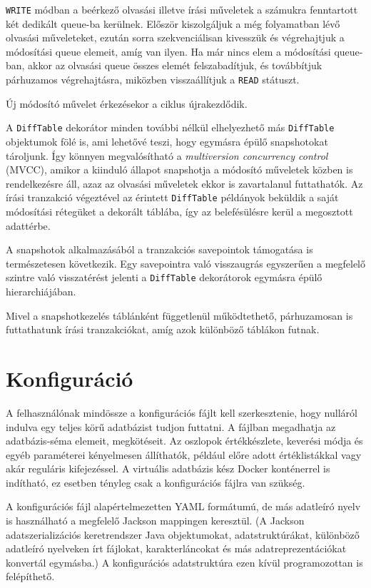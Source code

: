 \documentclass[
    parspace,
    noindent,
    nohyp,
]{elteiktdk}[2023/04/10]
\newcommand{\todoref}[1]{\todo[inline, noinlinepar, color=red, textcolor=white, inlinewidth=0.6cm, caption={#1}]{\large \textbf{×}}}
\begin{document}
\texttt{WRITE} módban a beérkező olvasási illetve írási műveletek
a számukra fenntartott két dedikált queue-ba kerülnek.
Először kiszolgáljuk a még folyamatban lévő olvasási műveleteket,
ezután sorra szekvenciálisan kivesszük és végrehajtjuk a módosítási queue elemeit, amíg van ilyen.
Ha már nincs elem a módosítási queue-ban,
akkor az olvasási queue összes elemét felszabadítjuk, és továbbítjuk párhuzamos végrehajtásra,
miközben visszaállítjuk a \texttt{READ} státuszt.

Új módosító művelet érkezésekor a ciklus újrakezdődik.

A \texttt{DiffTable} dekorátor minden további nélkül elhelyezhető
más \texttt{DiffTable} objektumok fölé is, ami lehetővé teszi, hogy egymásra épülő snapshotokat tároljunk.
Így könnyen megvalósítható a \textit{multiversion concurrency control} (MVCC),
amikor a kiinduló állapot snapshotja a módosító műveletek közben is rendelkezésre áll,
azaz az olvasási műveletek ekkor is zavartalanul futtathatók.
Az írási tranzakció végeztével az érintett \texttt{DiffTable} példányok
beküldik a saját módosítási rétegüket a dekorált táblába,
így az belefésülésre kerül a megosztott adattérbe.

A snapshotok alkalmazásából a tranzakciós savepointok támogatása is természetesen következik.
Egy savepointra való visszaugrás egyszerűen a megfelelő szintre való visszatérést jelenti
a \texttt{DiffTable} dekorátorok egymásra épülő hierarchiájában.

Mivel a snapshotkezelés táblánként függetlenül működtethető,
párhuzamosan is futtathatunk írási tranzakciókat,
amíg azok különböző táblákon futnak.


\section{Konfiguráció}

A felhasználónak mindössze a konfigurációs fájlt kell szerkesztenie,
hogy nulláról indulva egy teljes körű adatbázist tudjon futtatni.
A fájlban megadhatja az adatbázis-séma elemeit, megkötéseit.
Az oszlopok értékkészlete, keverési módja és egyéb paraméterei kényelmesen állíthatók,
például előre adott értéklistákkal vagy akár reguláris kifejezéssel.
A virtuális adatbázis kész Docker konténerrel is indítható,
ez esetben tényleg csak a konfigurációs fájlra van szükség.

A konfigurációs fájl alapértelmezetten YAML formátumú,
de más adatleíró nyelv is használható
a megfelelő Jackson mappingen keresztül.
(A Jackson adatszerializációs keretrendszer Java objektumokat, adatstruktúrákat,
különböző adatleíró nyelveken írt fájlokat, karakterláncokat
és más adatreprezentációkat konvertál egymásba.)
A konfigurációs adatstruktúra ezen kívül programozottan is felépíthető.
\todoref{+CITE: Jackson}
\todoref{Jackson: kicsit jobban bevezetni}
\end{document}
